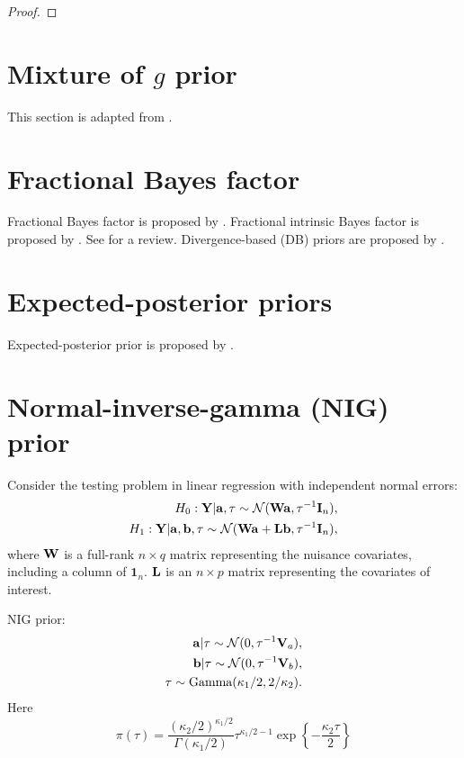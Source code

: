 \documentclass[11pt]{article}
\newcommand{\Ba}{\mathbf{a}}    \newcommand{\Bb}{\mathbf{b}}    \newcommand{\Bc}{\mathbf{c}}    \newcommand{\Bd}{\mathbf{d}}    \newcommand{\Be}{\mathbf{e}}    \newcommand{\Bf}{\mathbf{f}}    \newcommand{\Bg}{\mathbf{g}}    \newcommand{\Bh}{\mathbf{h}}    \newcommand{\Bi}{\mathbf{i}}    \newcommand{\Bj}{\mathbf{j}}    \newcommand{\Bk}{\mathbf{k}}    \newcommand{\Bl}{\mathbf{l}}
\newcommand{\BY}{\mathbf{Y}}    \newcommand{\BZ}{\mathbf{Z}}
\theoremstyle{plain}
\theoremstyle{definition}
\theoremstyle{remark}
\begin{document}
\begin{proof}
\end{proof}





\section{Mixture of $g$ prior}
This section is adapted from \cite{Liang2008Mixtures}.






\section{Fractional Bayes factor}
Fractional Bayes factor is proposed by \cite{Fractional1995}.
Fractional intrinsic Bayes factor is proposed by \cite{santis1997Alt}.
See \cite{Santis1999} for a review.
Divergence-based (DB) priors are proposed by \cite{Bayarri2008Gen}.








\section{Expected-posterior priors}
Expected-posterior prior is proposed by \cite{Perez2002}.
\section{Normal-inverse-gamma (NIG) prior}
\cite{zhou2018On}

Consider the testing problem in linear regression with independent normal errors:
\begin{equation*}
    \begin{split}
    H_0:
    \BY|\Ba,\tau \sim \mathcal N (\BW \Ba,\tau^{-1}\BI_n),
    \\
    H_1:
    \BY|\Ba,\Bb, \tau \sim \mathcal N (\BW \Ba + \BL \Bb, \tau^{-1} \BI_n),
    \end{split}
\end{equation*}
where $\mathbf{W}$ is a full-rank $n\times q$ matrix representing the nuisance covariates, including a column of $\mathbf 1_n$.
$\mathbf{L}$ is an $n\times p$ matrix representing the covariates of interest.

NIG prior:
\begin{equation*}
    \begin{split}
        \Ba | \tau \sim \mathcal N (0, \tau^{-1} \BV_a),
        \\
        \Bb | \tau \sim \mathcal N (0, \tau^{-1} \BV_b),
        \\
        \tau \sim \text{Gamma} (\kappa_1/2,2/\kappa_2)
        .
    \end{split}
\end{equation*}
Here
\begin{equation*}
        \pi(\tau) =\frac{(\kappa_2/2)^{\kappa_1/2}}{\Gamma (\kappa_1/2)}
        \tau^{\kappa_1/2-1} \exp\left\{-\frac{\kappa_2 \tau}{2}\right\}
\end{equation*}
\end{document}
